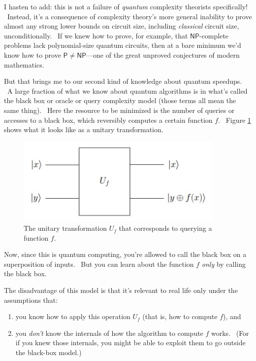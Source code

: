 \documentclass[11pt]{article}
\begin{document}
I hasten to add: this is not a failure of \emph{quantum} complexity theorists specifically! \ Instead, it's a consequence of complexity theory's more general inability to prove almost any strong lower bounds on circuit size, including \emph{classical} circuit size, unconditionally. \ If we knew how to prove, for example, that $\mathsf{NP}$-complete problems lack polynomial-size quantum circuits, then at a bare minimum we'd know how to prove $\mathsf{P} \neq \mathsf{NP}$---one of the great unproved conjectures of modern mathematics.

But that brings me to our second kind of knowledge about quantum speedups. \ A large fraction of what we know about quantum algorithms is in what's called the black box or oracle or query complexity model (those terms all mean the same thing). \ Here the resource to be minimized is the number of queries or accesses to a black box, which reversibly computes a certain function $f$. \ Figure \ref{query} shows what it looks like as a unitary transformation.

\begin{figure}
\centering
\includegraphics[width=4in]{query.jpg}
\caption{The unitary transformation $U_f$ that corresponds to querying a function $f$.}
\label{query}
\end{figure}

Now, since this is quantum computing, you're allowed to call the black box on a superposition of inputs. \ But you can learn about the function $f$ \emph{only} by calling the black box.

The disadvantage of this model is that it's relevant to real life only under the assumptions that:

\begin{enumerate}
\item[(1)] you know how to apply this operation $U_f$ (that is, how to compute $f$), and
\item[(2)] you \emph{don't} know the internals of how the algorithm to compute $f$ works. \ (For if you knew those internals, you might be able to exploit them to go outside the black-box model.)
\end{enumerate}
\end{document}
